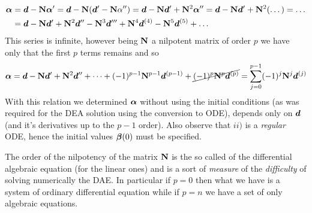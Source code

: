 		\begin{align*}
			\boldsymbol{\alpha} & = \boldsymbol{d} - \mathbf{N} \boldsymbol{\alpha}' = \boldsymbol{d} - \mathbf{N}(\boldsymbol{d}' - \mathbf{N} \alpha'') = \boldsymbol{d} - \mathbf{N} \boldsymbol{d}' + \mathbf{N}^2 \boldsymbol{\alpha}'' = \boldsymbol{d} - \mathbf{N} \boldsymbol{d}' + \mathbf{N}^2 (\dots) = \dots \\
			& = \boldsymbol{d} - \mathbf{N} \boldsymbol{d}' + \mathbf{N}^2 \boldsymbol{d}'' - \mathbf{N}^3 \boldsymbol{d}''' + \mathbf{N}^4 \boldsymbol{d}^{(4)} - \mathbf{N}^5 \boldsymbol{d}^{(5)} + \dots
		\end{align*}
		This series is infinite, however being $\mathbf{N}$ a nilpotent matrix of order $p$ we have only that the first $p$ terms remains and so
		\begin{equation}
			\boldsymbol{\alpha} = \boldsymbol{d} - \mathbf{N} \boldsymbol{d}' + \mathbf{N}^2 \boldsymbol{d}'' +\dots  + (-1)^{p-1} \mathbf{N}^{p-1}\boldsymbol{d}^{(p-1)} + \cancel{(-1)^p \mathbf{N}^p \boldsymbol{d}^{(p)}} = \sum_{j=0}^{p-1} (-1)^j \mathbf{N}^j \boldsymbol{d}^{(j)}
		\end{equation}
		With this relation we determined $\boldsymbol{\alpha}$ without using the initial conditions (as was required for the DEA solution using the conversion to ODE), depends only on $\boldsymbol{d}$ (and it's derivatives up to the $p-1$ order). Also observe that $ii)$ is a \textit{regular} ODE, hence the initial values $\boldsymbol{\beta}(0)$ must be specified.
		
		The order of the nilpotency of the matrix $\mathbf{N}$ is the so called  of the differential algebraic equation (for the linear ones) and is a sort of \textit{measure} of the \textit{difficulty} of solving numerically the DAE. In particular if $p=0$ then what we have is a system of ordinary differential equation while if $p=n$ we have a set of only algebraic equations.
	
	
	
	
	
	
	
	
	
	
	
	
	
	
	
	
	
	
	
	
	
	
	
	
	
	
	
	
	
